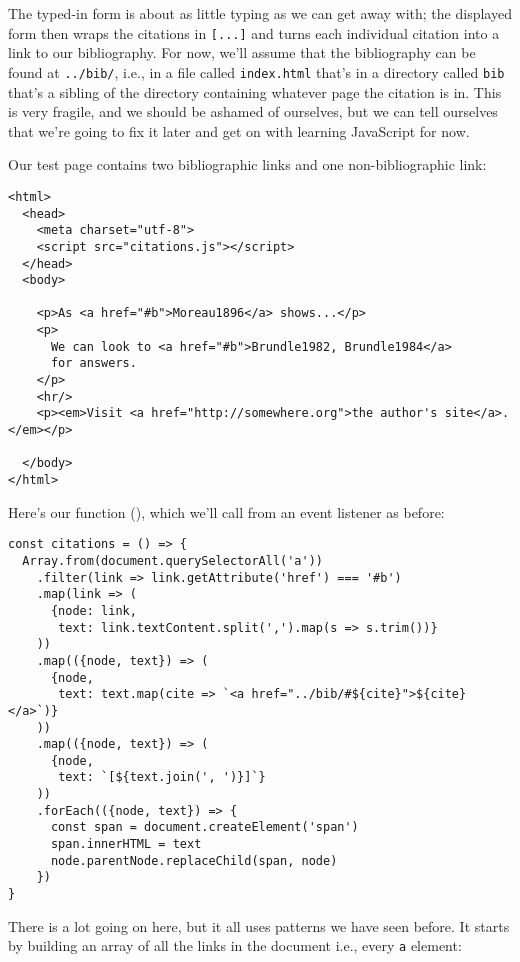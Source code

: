 The typed-in form is about as little typing as we can get away with;
the displayed form then wraps the citations in \texttt{[...]}
and turns each individual citation into a link to our bibliography.
For now,
we'll assume that the bibliography can be found at \texttt{../bib/},
i.e.,
in a file called \texttt{index.html} that's in a directory called \texttt{bib}
that's a sibling of the directory containing whatever page the citation is in.
This is very fragile,
and we should be ashamed of ourselves,
but we can tell ourselves that we're going to fix it later
and get on with learning JavaScript for now.

Our test page contains two bibliographic links
and one non-bibliographic link:

\begin{verbatim}
<html>
  <head>
    <meta charset="utf-8">
    <script src="citations.js"></script>
  </head>
  <body>

    <p>As <a href="#b">Moreau1896</a> shows...</p>
    <p>
      We can look to <a href="#b">Brundle1982, Brundle1984</a>
      for answers.
    </p>
    <hr/>
    <p><em>Visit <a href="http://somewhere.org">the author's site</a>.</em></p>
    
  </body>
</html>
\end{verbatim}

\noindent
Here's our function (),
which we'll call from an event listener as before:

\begin{verbatim}
const citations = () => {
  Array.from(document.querySelectorAll('a'))
    .filter(link => link.getAttribute('href') === '#b')
    .map(link => (
      {node: link,
       text: link.textContent.split(',').map(s => s.trim())}
    ))
    .map(({node, text}) => (
      {node,
       text: text.map(cite => `<a href="../bib/#${cite}">${cite}</a>`)}
    ))
    .map(({node, text}) => (
      {node,
       text: `[${text.join(', ')}]`}
    ))
    .forEach(({node, text}) => {
      const span = document.createElement('span')
      span.innerHTML = text
      node.parentNode.replaceChild(span, node)
    })
}
\end{verbatim}


There is a lot going on here,
but it all uses patterns we have seen before.
It starts by building an array of all the links in the document
i.e., every \texttt{a} element:

